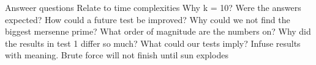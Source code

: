 \documentclass[main.tex]{subfiles}
\begin{document}
Answeer questions
Relate to time complexities
Why k = 10?
Were the answers expected?
How could a future test be improved?
Why could we not find the biggest mersenne prime?
What order of magnitude are the numbers on?
Why did the results in test 1 differ so much?
What could our tests imply?
Infuse results with meaning.
Brute force will not finish until sun explodes
\end{document}
